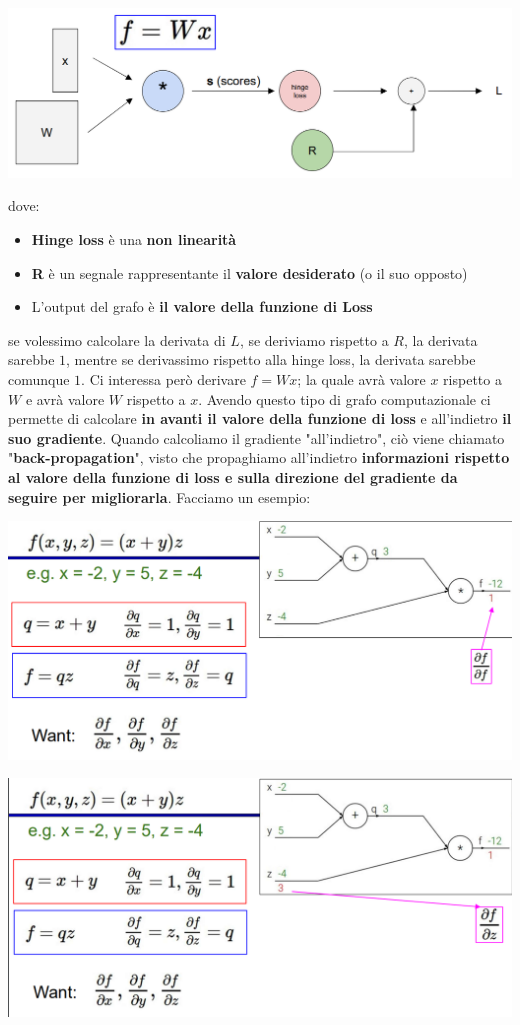 \documentclass[12pt]{article}
\begin{document}
\begin{center}
    \includegraphics[width =0.80\linewidth]{Images/120.PNG}
\end{center}
dove:
\begin{itemize}
    \item \textbf{Hinge loss} è una \textbf{non linearità}
    \item \textbf{R} è un segnale rappresentante il \textbf{valore desiderato} (o il suo opposto)
    \item L'output del grafo è \textbf{il valore della funzione di Loss}
\end{itemize}
se volessimo calcolare la derivata di $L$, se deriviamo rispetto a $R$, la derivata sarebbe $1$, mentre se derivassimo rispetto alla hinge loss, la derivata sarebbe comunque $1$.
Ci interessa però derivare  $f = Wx$; la quale avrà valore $x$ rispetto a $W$ e avrà valore $W$ rispetto a $x$. Avendo questo tipo di grafo computazionale ci permette di calcolare \textbf{in avanti il valore della funzione di loss} e all'indietro \textbf{il suo gradiente}.
Quando calcoliamo il gradiente "all'indietro", ciò viene chiamato "\textbf{back-propagation}", visto che propaghiamo all'indietro \textbf{informazioni rispetto al valore della funzione di loss e sulla direzione del gradiente da seguire per migliorarla}.
Facciamo un esempio: 
\begin{center}
    \includegraphics[width =1\linewidth]{Images/121.PNG}
\end{center}
\begin{center}
    \includegraphics[width =1\linewidth]{Images/122.PNG}
\end{center}
\end{document}
